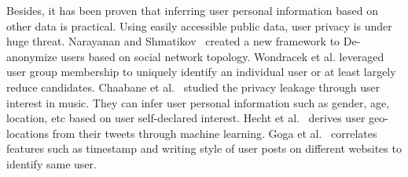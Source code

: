 Besides, it has been proven that inferring user personal information based on other data is practical. Using easily accessible public data, user privacy is under huge threat. Narayanan and Shmatikov~\cite{narayanan2009anonymizing} created a new framework to De-anonymize users based on social network topology. Wondracek et al. \cite{wondracek2010practical} leveraged user group membership to uniquely identify an individual user or at least largely reduce candidates. Chaabane et al.~\cite{chaabane2012you} studied the privacy leakage through user interest in music. They can infer user personal information such as gender, age, location, etc based on user self-declared interest. Hecht et al.~\cite{hecht2011tweets} derives user geo-locations from their tweets through machine learning. Goga et al.~\cite{goga2013exploiting} correlates features such as timestamp and writing style of user posts on different websites to identify same user.



